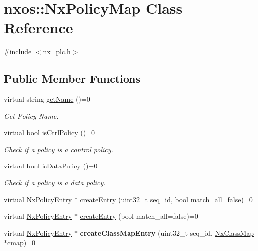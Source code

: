 \hypertarget{classnxos_1_1NxPolicyMap}{\section{nxos\-:\-:Nx\-Policy\-Map Class Reference}
\label{classnxos_1_1NxPolicyMap}
}


{\ttfamily \#include $<$nx\-\_\-plc.\-h$>$}

\subsection*{Public Member Functions}
\begin{DoxyCompactItemize}
\item 
\hypertarget{classnxos_1_1NxPolicyMap_a9d4e578ede72007153d5df5495943264}{virtual string \hyperlink{classnxos_1_1NxPolicyMap_a9d4e578ede72007153d5df5495943264}{get\-Name} ()=0}\label{classnxos_1_1NxPolicyMap_a9d4e578ede72007153d5df5495943264}

\begin{DoxyCompactList}\small\item\em Get Policy Name. \end{DoxyCompactList}\item 
\hypertarget{classnxos_1_1NxPolicyMap_a136b6e212a8c3182e69921c3342a1d30}{virtual bool \hyperlink{classnxos_1_1NxPolicyMap_a136b6e212a8c3182e69921c3342a1d30}{is\-Ctrl\-Policy} ()=0}\label{classnxos_1_1NxPolicyMap_a136b6e212a8c3182e69921c3342a1d30}

\begin{DoxyCompactList}\small\item\em Check if a policy is a control policy. \end{DoxyCompactList}\item 
\hypertarget{classnxos_1_1NxPolicyMap_ac8122a60a863e8dc5ba5cad83fb7bdc7}{virtual bool \hyperlink{classnxos_1_1NxPolicyMap_ac8122a60a863e8dc5ba5cad83fb7bdc7}{is\-Data\-Policy} ()=0}\label{classnxos_1_1NxPolicyMap_ac8122a60a863e8dc5ba5cad83fb7bdc7}

\begin{DoxyCompactList}\small\item\em Check if a policy is a data policy. \end{DoxyCompactList}\item 
virtual \hyperlink{classnxos_1_1NxPolicyEntry}{Nx\-Policy\-Entry} $\ast$ \hyperlink{classnxos_1_1NxPolicyMap_a2e9f14a28a0ff7c61b1f9156ef86ff59}{create\-Entry} (uint32\-\_\-t seq\-\_\-id, bool match\-\_\-all=false)=0
\item 
virtual \hyperlink{classnxos_1_1NxPolicyEntry}{Nx\-Policy\-Entry} $\ast$ \hyperlink{classnxos_1_1NxPolicyMap_a84487a3f2b9ec7e3c290f8e22d8dc080}{create\-Entry} (bool match\-\_\-all=false)=0
\item 
\hypertarget{classnxos_1_1NxPolicyMap_aaa0f43730556977937611ff2f114d695}{virtual \hyperlink{classnxos_1_1NxPolicyEntry}{Nx\-Policy\-Entry} $\ast$ {\bfseries create\-Class\-Map\-Entry} (uint32\-\_\-t seq\-\_\-id, \hyperlink{classnxos_1_1NxClassMap}{Nx\-Class\-Map} $\ast$cmap)=0}\label{classnxos_1_1NxPolicyMap_aaa0f43730556977937611ff2f114d695}


\end{DoxyCompactItemize}
